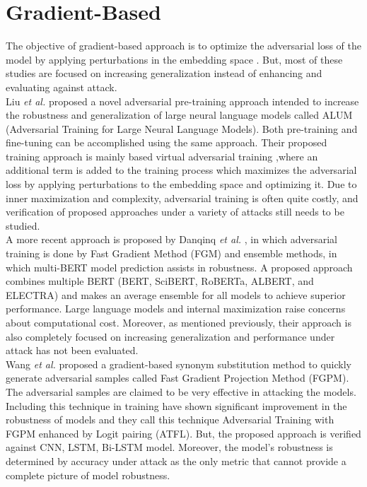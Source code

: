 \documentclass[%
	BCOR=8mm, %
	DIV=12,
	toc=bibliography, %
	toc=listof, %
	oneside, %
	egregdoesnotlikesansseriftitles, %
	]{scrbook}
\begin{document}
\section{Gradient-Based }
\label{section:GradBasedAdvTra}
The objective of gradient-based approach is to optimize the adversarial loss of the model by applying perturbations in the embedding space \cite{liu_adversarial_2020,goodfellow_explaining_2015,zhu_at-bert_2021,miyato_adversarial_2017,jiang_smart_2020-1}.  But, most of these studies are focused on increasing generalization instead of enhancing and evaluating against attack.\\
 Liu \textit{et al.} \cite{liu_adversarial_2020} proposed a novel adversarial pre-training approach intended to increase the robustness and generalization of large neural language models called ALUM (Adversarial Training for Large Neural Language Models). Both pre-training and fine-tuning can be accomplished using the same approach. Their proposed training approach is mainly based virtual adversarial training \cite{miyato_virtual_2018},where an additional term is added to the training process which maximizes the adversarial loss by applying perturbations to the embedding space and optimizing it. Due to inner maximization and complexity, adversarial training is often quite costly, and verification of proposed approaches under a variety of attacks still needs to be studied.\\
A more recent approach is proposed by Danqinq \textit{et al.} \cite{zhu_at-bert_2021}, in which adversarial training is done by Fast Gradient Method (FGM) \cite{miyato_adversarial_2017} and ensemble methods, in which multi-BERT model prediction assists in robustness. A proposed approach combines multiple BERT (BERT, SciBERT, RoBERTa, ALBERT, and ELECTRA) and makes an average ensemble for all models to achieve superior performance. Large language models and internal maximization raise concerns about computational cost. Moreover, as mentioned previously, their approach is also completely focused on increasing generalization and performance under attack has not been evaluated.\\
Wang \textit{et al.} \cite{wang_adversarial_2021-1} proposed a gradient-based synonym substitution method to quickly generate adversarial samples called Fast Gradient Projection Method (FGPM). The adversarial samples are claimed to be very effective in attacking the models. Including this technique in training have shown significant improvement in the robustness of models and they call this technique Adversarial Training with FGPM enhanced by Logit pairing (ATFL). But, the proposed approach is verified against CNN, LSTM, Bi-LSTM model. Moreover, the model's robustness is determined by accuracy under attack as the only metric that cannot provide a complete picture of model robustness.
\end{document}
